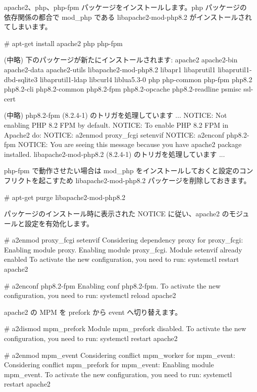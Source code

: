 \documentclass[mingoth,a4paper]{jsarticle}
\begin{document}
apache2、php、php-fpm パッケージをインストールします。php パッケージの依存関係の都合で mod\_php である libapache2-mod-php8.2 がインストールされてしまいます。

\begin{commandline}
# apt-get install apache2 php php-fpm

  (中略)
下のパッケージが新たにインストールされます:
  apache2 apache2-bin apache2-data apache2-utils libapache2-mod-php8.2
  libapr1 libaprutil1 libaprutil1-dbd-sqlite3 libaprutil1-ldap libcurl4
  liblua5.3-0 php php-common php-fpm php8.2 php8.2-cli php8.2-common
  php8.2-fpm php8.2-opcache php8.2-readline psmisc ssl-cert

  (中略)
php8.2-fpm (8.2.4-1) のトリガを処理しています ...
NOTICE: Not enabling PHP 8.2 FPM by default.
NOTICE: To enable PHP 8.2 FPM in Apache2 do:
NOTICE: a2enmod proxy_fcgi setenvif
NOTICE: a2enconf php8.2-fpm
NOTICE: You are seeing this message because you have apache2 package installed.
libapache2-mod-php8.2 (8.2.4-1) のトリガを処理しています ...
\end{commandline}

php-fpm で動作させたい場合は mod\_php をインストールしておくと設定のコンフリクトを起こすため libapache2-mod-php8.2 パッケージを削除しておきます。

\begin{commandline}
# apt-get purge libapache2-mod-php8.2
\end{commandline}

パッケージのインストール時に表示された NOTICE に従い、apache2 のモジュールと設定を有効化します。

\begin{commandline}
# a2enmod proxy_fcgi setenvif
Considering dependency proxy for proxy_fcgi:
Enabling module proxy.
Enabling module proxy_fcgi.
Module setenvif already enabled
To activate the new configuration, you need to run:
  systemctl restart apache2

# a2enconf php8.2-fpm
Enabling conf php8.2-fpm.
To activate the new configuration, you need to run:
  systemctl reload apache2
\end{commandline}

apache2 の MPM を prefork から event へ切り替えます。

\begin{commandline}
# a2dismod mpm_prefork  
Module mpm_prefork disabled.
To activate the new configuration, you need to run:
  systemctl restart apache2

# a2enmod mpm_event
Considering conflict mpm_worker for mpm_event:
Considering conflict mpm_prefork for mpm_event:
Enabling module mpm_event.
To activate the new configuration, you need to run:
  systemctl restart apache2
\end{commandline}
\end{document}
